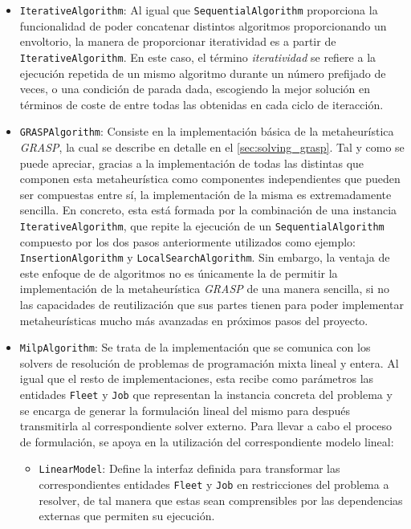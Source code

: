 \documentclass{subfiles}
\begin{document}
\begin{itemize}
              \item \texttt{IterativeAlgorithm}: Al igual que \texttt{SequentialAlgorithm} proporciona la funcionalidad de poder concatenar distintos algoritmos proporcionando un envoltorio, la manera de proporcionar iteratividad es a partir de \texttt{IterativeAlgorithm}. En este caso, el término \emph{iteratividad} se refiere a la ejecución repetida de un mismo algoritmo durante un número prefijado de veces, o una condición de parada dada, escogiendo la mejor solución en términos de coste de entre todas las obtenidas en cada ciclo de iteracción.

              \item \texttt{GRASPAlgorithm}: Consiste en la implementación básica de la metaheurística \emph{GRASP}, la cual se describe en detalle en el \cref{sec:solving_grasp}. Tal y como se puede apreciar, gracias a la implementación de todas las distintas  que componen esta metaheurística como componentes independientes que pueden ser compuestas entre sí, la implementación de la misma es extremadamente sencilla. En concreto, esta está formada por la combinación de una instancia \texttt{IterativeAlgorithm}, que repite la ejecución de un \texttt{SequentialAlgorithm} compuesto por los dos pasos anteriormente utilizados como ejemplo: \texttt{InsertionAlgorithm} y \texttt{LocalSearchAlgorithm}. Sin embargo, la ventaja de este enfoque de  de algoritmos no es únicamente la de permitir la implementación de la metaheurística \emph{GRASP} de una manera sencilla, si no las capacidades de reutilización que sus partes tienen para poder implementar metaheurísticas mucho más avanzadas en próximos pasos del proyecto.

              \item \texttt{MilpAlgorithm}: Se trata de la implementación que se comunica con los solvers de resolución de problemas de programación mixta lineal y entera. Al igual que el resto de implementaciones, esta recibe como parámetros las entidades \texttt{Fleet} y \texttt{Job} que representan la instancia concreta del problema y se encarga de generar la formulación lineal del mismo para después transmitirla al correspondiente solver externo. Para llevar a cabo el proceso de formulación, se apoya en la utilización del correspondiente modelo lineal:
          
                  \begin{itemize}

                      \item \texttt{LinearModel}: Define la interfaz definida para transformar las correspondientes entidades \texttt{Fleet} y \texttt{Job} en restricciones del problema a resolver, de tal manera que estas sean comprensibles por las dependencias externas que permiten su ejecución.
                  

\end{itemize}
\end{itemize}
\end{document}
